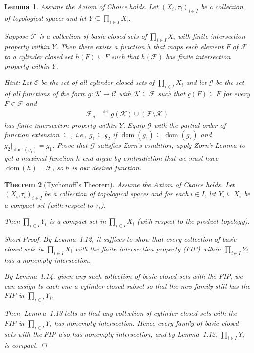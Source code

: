\documentclass[12pt]{article}
\theoremstyle{bigskipthmstyle}
\theoremstyle{thmstyle}
\newtheorem{theorem}{Theorem}[section]
\newtheorem{lemma}[theorem]{Lemma}
\theoremstyle{plainstyle}
\newcommand{\df}{\stackrel{\text{def}}{=}}
\newcommand{\rest}{\mathord{\vert}}
\DeclareMathOperator{\dom}{dom}
\newcommand{\cC}{\mathcal{C}}
\newcommand{\cF}{\mathcal{F}}
\newcommand{\cG}{\mathcal{G}}
\newcommand{\cK}{\mathcal{K}}
\begin{document}
\begin{lemma}\label{lem:bccyl}
  Assume the Axiom of Choice holds. Let $(X_i,\tau_i)_{i\in I}$ be a collection of topological
  spaces and let $Y\subseteq\prod_{i\in I} X_i$.

  Suppose $\cF$ is a collection of basic closed sets of $\prod_{i\in I} X_i$ with finite
  intersection property within $Y$. Then there exists a function $h$ that maps each element $F$ of
  $\cF$ to a cylinder closed set $h(F)\subseteq F$ such that $h(\cF)$ has finite intersection
  property within $Y$.

  Hint: Let $\cC$ be the set of all cylinder closed sets of $\prod_{i\in I} X_i$ and let $\cG$ be the set of all functions of
  the form $g\colon\cK\to\cC$ with $\cK\subseteq\cF$ such that $g(F)\subseteq F$ for every $F\in\cF$ and
  \begin{align*}
    \cF_g & \df g(\cK)\cup(\cF\setminus\cK)
  \end{align*}
  has finite intersection property within $Y$. Equip $\cG$ with the partial order of function extension $\subseteq$, i.e.,
  $g_1\subseteq g_2$ if $\dom(g_1)\subseteq\dom(g_2)$ and $g_2\rest_{\dom(g_1)} = g_1$. Prove that $\cG$ satisfies Zorn's
  condition, apply Zorn's Lemma to get a maximal function $h$ and argue by contradiction that we must have $\dom(h) = \cF$, so
  $h$ is our desired function.


\end{lemma}

\begin{theorem}[Tychonoff's Theorem]
  Assume the Axiom of Choice holds. Let $(X_i,\tau_i)_{i\in I}$ be a collection of topological
  spaces and for each $i\in I$, let $Y_i\subseteq X_i$ be a compact set (with respect to $\tau_i$).

  Then $\prod_{i\in I} Y_i$ is a compact set in $\prod_{i\in I} X_i$ (with respect to the product
  topology).
  
  
\begin{proof}[Short Proof]
By Lemma~1.12, it suffices to show that every collection of \emph{basic closed} sets in 
\(\prod_{i\in I} X_i\) with the finite intersection property (FIP) within 
\(\prod_{i\in I} Y_i\) has a nonempty intersection.

By Lemma~1.14, given any such collection of basic closed sets with the FIP, we can assign 
to each one a \emph{cylinder closed} subset so that the new family still has the FIP in 
\(\prod_{i\in I} Y_i\).

Then, Lemma~1.13 tells us that any collection of cylinder closed sets with the FIP in 
\(\prod_{i\in I} Y_i\) has nonempty intersection. Hence every family of basic closed sets 
with the FIP also has nonempty intersection, and by Lemma~1.12, \(\prod_{i\in I} Y_i\) is compact.

\renewcommand\qedsymbol{QED}
\end{proof}


\end{theorem}
\end{document}
